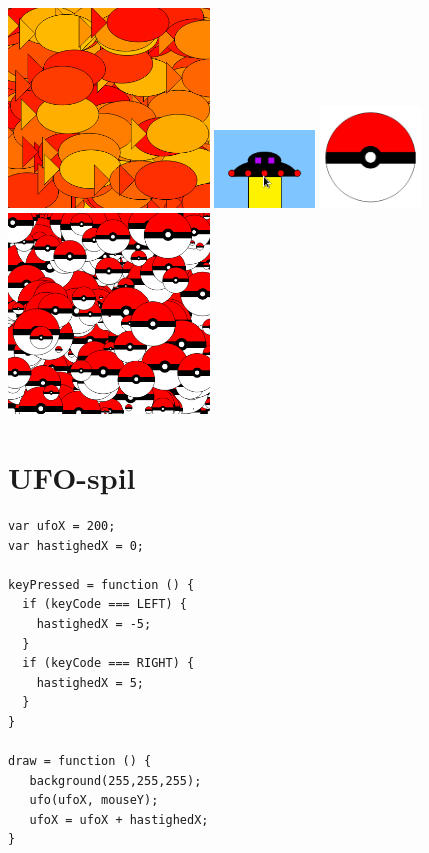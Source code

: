 \documentclass[oneside,a4paper,10pts,article]{memoir}
\begin{document}
\hspace{-20mm}
\includegraphics[width=0.4\textwidth]{pics/flerefisk.png}
\includegraphics[width=0.2\textwidth]{pics/ufo.png}
\includegraphics[width=0.2\textwidth]{pics/pokeball.png}
\includegraphics[width=0.4\textwidth]{pics/pokeballs.png}


\newpage
\chapter{UFO-spil}
\begin{lstlisting}
var ufoX = 200;
var hastighedX = 0;

keyPressed = function () {
  if (keyCode === LEFT) {
    hastighedX = -5;
  }
  if (keyCode === RIGHT) {
    hastighedX = 5;
  }
}

draw = function () {
   background(255,255,255);
   ufo(ufoX, mouseY);
   ufoX = ufoX + hastighedX;
}
\end{lstlisting}
\end{document}
